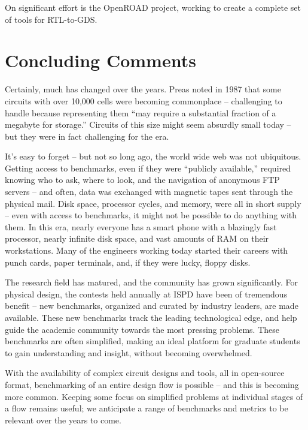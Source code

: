 \documentclass[sigconf]{acmart}
\begin{document}
On significant effort is the OpenROAD\cite{Ajayi19} project,
working to create a complete set of tools for RTL-to-GDS.




\section{Concluding Comments}


Certainly, much has changed over the years.  Preas\cite{Preas87}
noted in 1987 that some circuits with over 10,000 cells were becoming
commonplace -- challenging to handle because representing them
``may require a substantial fraction of a megabyte for storage.''
Circuits of this size might seem absurdly small today -- but they
were in fact challenging for the era.

It's easy to forget -- but not so long ago, the world wide web was not
ubiquitous. Getting access to benchmarks, even if they were ``publicly
available,'' required knowing who to ask, where to look, and the
navigation of anonymous FTP servers -- and often, data was
exchanged with magnetic tapes sent through the physical mail.
Disk space, processor cycles,
and memory, were all in short supply -- even with access to
benchmarks, it might not be possible to do anything with them.  In
this era, nearly everyone has a smart phone with a blazingly fast
processor, nearly infinite disk space, and vast amounts of RAM on
their workstations.  Many of the engineers working today started their
careers with punch cards, paper terminals, and, if they were lucky,
floppy disks.

The research field has matured, and the community has grown
significantly.  For physical design, the contests held annually
at ISPD have been of tremendous benefit -- new benchmarks, organized
and curated by industry leaders, are made available.  These
new benchmarks track the leading technological edge, and help
guide the academic community towards the most pressing problems.
These benchmarks are often simplified, making an ideal platform
for graduate students to gain understanding and insight, without
becoming overwhelmed.

With the availability of complex circuit designs and tools, all in
open-source format, benchmarking of an entire design flow is possible --
and this is becoming more common.  Keeping some focus on simplified
problems at individual stages of a flow remains useful; we 
anticipate a range of benchmarks and metrics to be relevant over
the years to come.




\balance


\end{document}
